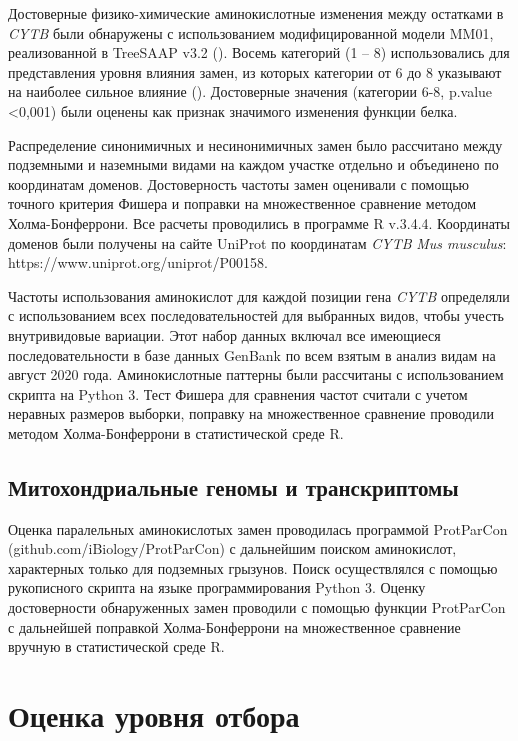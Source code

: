 Достоверные физико-химические аминокислотные изменения между остатками в \textit{CYTB} были обнаружены с использованием модифицированной модели MM01, реализованной в TreeSAAP v3.2 (\cite{Woolley2003}). Восемь категорий (1 -- 8) использовались для представления уровня влияния замен, из которых категории от 6 до 8 указывают на наиболее сильное влияние (\cite{McClellan2001}). Достоверные значения (категории 6-8, p.value <0,001) были оценены как признак значимого изменения функции белка.

Распределение синонимичных и несинонимичных замен было рассчитано между подземными и наземными видами на каждом участке отдельно и объединено по координатам доменов. Достоверность частоты замен оценивали с помощью точного критерия Фишера и поправки на множественное сравнение методом Холма-Бонферрони. Все расчеты проводились в программе R v.3.4.4. Координаты доменов были получены на сайте UniProt по координатам \textit{CYTB} \textit{Mus musculus}: https://www.uniprot.org/uniprot/P00158.

Частоты использования аминокислот для каждой позиции гена \textit{CYTB} определяли с использованием всех последовательностей для выбранных видов, чтобы учесть внутривидовые вариации. Этот набор данных включал все имеющиеся последовательности в базе данных GenBank по всем взятым в анализ видам на август 2020 года. Аминокислотные паттерны были рассчитаны с использованием скрипта на Python 3. Тест Фишера для сравнения частот считали с учетом неравных размеров выборки, поправку на множественное сравнение проводили методом Холма-Бонферрони в статистической среде R.

\subsection{Митохондриальные геномы и транскриптомы}

Оценка паралельных аминокислотых замен проводилась программой ProtParCon (github.com/iBiology/ProtParCon) с дальнейшим поиском аминокислот, характерных только для подземных грызунов. Поиск осуществлялся с помощью рукописного скрипта на языке программирования Python 3. Оценку достоверности обнаруженных замен проводили с помощью функции ProtParCon с дальнейшей поправкой Холма-Бонферрони на множественное сравнение вручную в статистической среде R.  

\section{Оценка уровня отбора}

